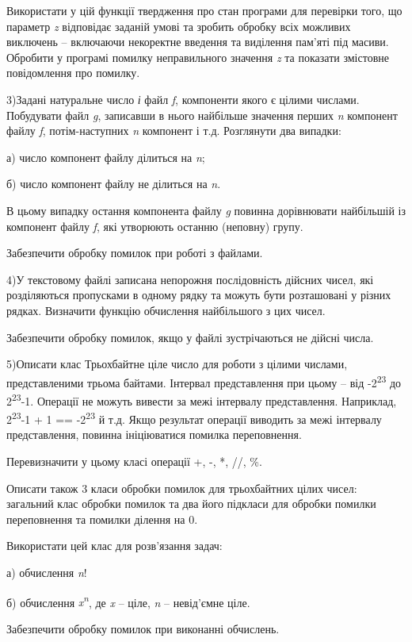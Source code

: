 \documentclass[]{article}
\begin{document}
Використати у цій функції твердження про стан програми для перевірки
того, що параметр \emph{z} відповідає заданій умові та зробить обробку
всіх можливих виключень -- включаючи некоректне введення та виділення
пам'яті під масиви. Обробити у програмі помилку неправильного значення
\emph{z} та показати змістовне повідомлення про помилку.

3)Задані натуральне число \emph{і} файл \emph{f}, компоненти якого є
цілими числами. Побудувати файл \emph{g}, записавши в нього найбільше
значення перших \emph{n} компонент файлу \emph{f}, потім-наступних
\emph{n} компонент і т.д. Розглянути два випадки:

а) число компонент файлу ділиться на \emph{n};

б) число компонент файлу не ділиться на \emph{n}.

В цьому випадку остання компонента файлу \emph{g} повинна дорівнювати
найбільшій із компонент файлу \emph{f}, які утворюють останню (неповну)
групу.

Забезпечити обробку помилок при роботі з файлами.

4)У текстовому файлі записана непорожня послідовність дійсних чисел, які
розділяються пропусками в одному рядку та можуть бути розташовані у
різних рядках. Визначити функцію обчислення найбільшого з цих чисел.

Забезпечити обробку помилок, якщо у файлі зустрічаються не дійсні числа.

5)Описати клас Трьохбайтне ціле число для роботи з цілими числами,
представленими трьома байтами. Інтервал представлення при цьому -- від
-2\textsuperscript{23} до 2\textsuperscript{23}-1. Операції не можуть
вивести за межі інтервалу представлення. Наприклад,
2\textsuperscript{23}-1 + 1 == -2\textsuperscript{23} й т.д. Якщо
результат операції виводить за межі інтервалу представлення, повинна
ініціюватися помилка переповнення.

Перевизначити у цьому класі операції +, -, *, //, \%.

Описати також 3 класи обробки помилок для трьохбайтних цілих чисел:
загальний клас обробки помилок та два його підкласи для обробки помилки
переповнення та помилки ділення на 0.

Використати цей клас для розв'язання задач:

а) обчислення \emph{n}!

б) обчислення \emph{x\textsuperscript{n}}, де \emph{x} -- ціле, \emph{n}
-- невід'ємне ціле.

Забезпечити обробку помилок при виконанні обчислень.
\end{document}

